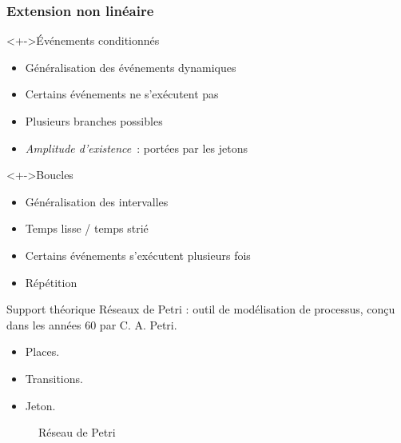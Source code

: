 \begin{frame}
	\frametitle{Extension non linéaire}
	\begin{block}<+->{Événements conditionnés}
		\begin{itemize}
			\item Généralisation des événements dynamiques
			\item Certains événements ne s'exécutent pas
			\item Plusieurs branches possibles
			\item \emph{Amplitude d'existence}~: portées par les jetons
		\end{itemize}
	\end{block}
	
	\begin{block}<+->{Boucles}
		\begin{itemize}
			\item Généralisation des intervalles
			\item Temps lisse / temps strié
			\item Certains événements s'exécutent plusieurs fois
			\item Répétition
		\end{itemize}
	\end{block}
\end{frame}

\begin{frame}{Support théorique}
	Réseaux de Petri : outil de modélisation de processus, conçu dans les années 60 par C. A. Petri.
	
	\begin{itemize}
		\item Places.
		\item Transitions.
		\item Jeton.
	\end{itemize}
	
	\begin{figure}[h!]
		\centering
		\caption{Réseau de Petri}
		\label{fig:petriNet}
	\end{figure}
	
\end{frame}

